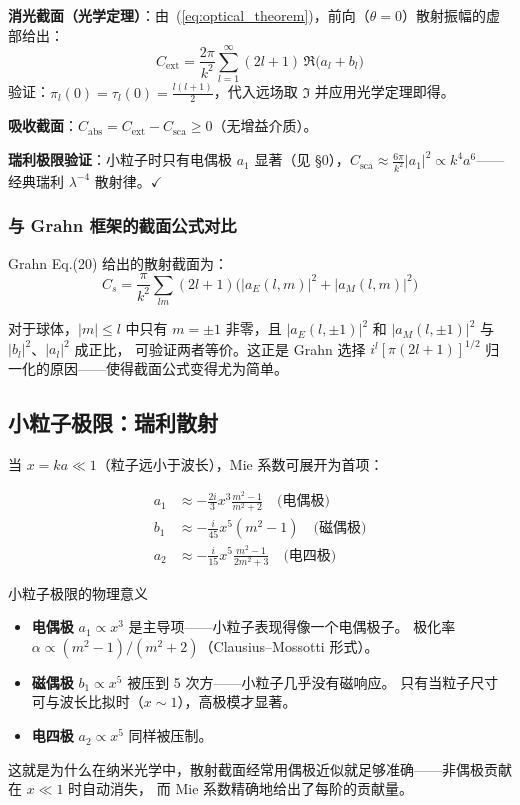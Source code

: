 \textbf{消光截面（光学定理）}：由~(\ref{eq:optical_theorem})，前向（$\theta=0$）散射振幅的虚部给出：
\begin{equation}
  C_{\text{ext}} = \frac{2\pi}{k^2}\sum_{l=1}^{\infty}(2l+1)\,\Re\bigl(a_l + b_l\bigr)
  \label{eq:Cext_mie}
\end{equation}
验证：$\pi_l(0)=\tau_l(0)=\frac{l(l+1)}{2}$，代入远场取 $\Im$ 并应用光学定理即得。

\textbf{吸收截面}：$C_{\text{abs}} = C_{\text{ext}} - C_{\text{sca}} \ge 0$（无增益介质）。

\begin{noteworthy}
\textbf{瑞利极限验证}：小粒子时只有电偶极 $a_1$ 显著（见 \S0），$C_{\text{sca}} \approx
\frac{6\pi}{k^2}|a_1|^2 \propto k^4a^6$——经典瑞利 $\lambda^{-4}$ 散射律。$\checkmark$
\end{noteworthy}

\subsubsection{与 Grahn 框架的截面公式对比}

Grahn Eq.(20) 给出的散射截面为：
$$
C_s = \frac{\pi}{k^2}\sum_{lm}(2l+1)\bigl(|a_E(l,m)|^2 + |a_M(l,m)|^2\bigr)
$$

对于球体，$|m|\le l$ 中只有 $m=\pm1$ 非零，且 $|a_E(l,\pm1)|^2$ 和 $|a_M(l,\pm1)|^2$ 与 $|b_l|^2$、$|a_l|^2$ 成正比，
可验证两者等价。这正是 Grahn 选择 $i^l[\pi(2l+1)]^{1/2}$ 归一化的原因——使得截面公式变得尤为简单。

\subsection{小粒子极限：瑞利散射}

当 $x = ka \ll 1$（粒子远小于波长），Mie 系数可展开为首项：

\begin{align}
  a_1 &\approx -\frac{2i}{3}x^3\frac{m^2-1}{m^2+2} \quad\text{(电偶极)} \\
  b_1 &\approx -\frac{i}{45}x^5(m^2-1) \quad\text{(磁偶极)} \\
  a_2 &\approx -\frac{i}{15}x^5\frac{m^2-1}{2m^2+3} \quad\text{(电四极)}
\end{align}

\begin{stepbox}{小粒子极限的物理意义}
\begin{itemize}
  \item \textbf{电偶极} $a_1 \propto x^3$ 是主导项——小粒子表现得像一个电偶极子。
    极化率 $\alpha \propto (m^2-1)/(m^2+2)$（Clausius--Mossotti 形式）。
  \item \textbf{磁偶极} $b_1 \propto x^5$ 被压到 5 次方——小粒子几乎没有磁响应。
    只有当粒子尺寸可与波长比拟时（$x\sim 1$），高极模才显著。
  \item \textbf{电四极} $a_2 \propto x^5$ 同样被压制。
\end{itemize}
这就是为什么在纳米光学中，散射截面经常用偶极近似就足够准确——非偶极贡献在 $x\ll1$ 时自动消失，
而 Mie 系数精确地给出了每阶的贡献量。
\end{stepbox}

